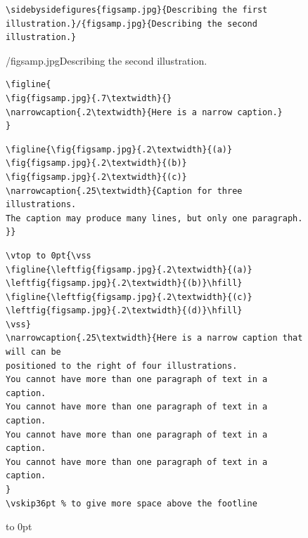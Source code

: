 \documentclass[reprint]{JASA}
\begin{document}
\begin{figure}
\baselineskip=12pt
\begin{verbatim}
\sidebysidefigures{figsamp.jpg}{Describing the first
illustration.}/{figsamp.jpg}{Describing the second illustration.}
\end{verbatim}

/{figsamp.jpg}{Describing the second illustration.}
\end{figure}


\begin{figure}
\baselineskip=12pt
\begin{verbatim}
\figline{
\fig{figsamp.jpg}{.7\textwidth}{}
\narrowcaption{.2\textwidth}{Here is a narrow caption.}
}
\end{verbatim}
\end{figure}


\begin{figure}
\baselineskip=12pt
\begin{verbatim}
\figline{\fig{figsamp.jpg}{.2\textwidth}{(a)}
\fig{figsamp.jpg}{.2\textwidth}{(b)}
\fig{figsamp.jpg}{.2\textwidth}{(c)}
\narrowcaption{.25\textwidth}{Caption for three illustrations. 
The caption may produce many lines, but only one paragraph.
}}
\end{verbatim}
\end{figure}


\begin{figure}
\baselineskip=12pt
\begin{verbatim}
\vtop to 0pt{\vss
\figline{\leftfig{figsamp.jpg}{.2\textwidth}{(a)}
\leftfig{figsamp.jpg}{.2\textwidth}{(b)}\hfill}
\figline{\leftfig{figsamp.jpg}{.2\textwidth}{(c)}
\leftfig{figsamp.jpg}{.2\textwidth}{(d)}\hfill}
\vss}
\narrowcaption{.25\textwidth}{Here is a narrow caption that will can be
positioned to the right of four illustrations.
You cannot have more than one paragraph of text in a caption.
You cannot have more than one paragraph of text in a caption.
You cannot have more than one paragraph of text in a caption.
You cannot have more than one paragraph of text in a caption.
}
\vskip36pt % to give more space above the footline
\end{verbatim}
\vskip1.3in
\vtop to 0pt{\vss
{}
\vss}
\vskip36pt
\end{figure}
\end{document}

